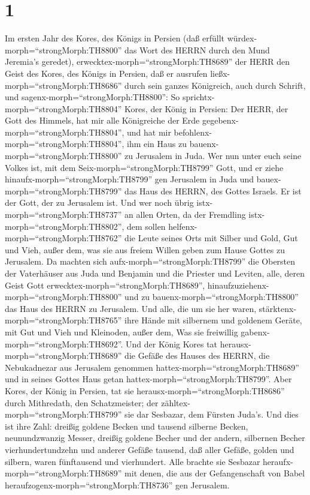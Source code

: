 \hypertarget{section}{%
\section{1}\label{section}}

 Im ersten Jahr des Kores, des Königs in Persien (daß
erfüllt würdex-morph=``strongMorph:TH8800'' das Wort des HERRN durch den
Mund Jeremia's geredet), erwecktex-morph=``strongMorph:TH8689'' der HERR
den Geist des Kores, des Königs in Persien, daß er ausrufen
ließx-morph=``strongMorph:TH8686'' durch sein ganzes Königreich, auch
durch Schrift, und sagenx-morph=``strongMorph:TH8800'':  So
sprichtx-morph=``strongMorph:TH8804'' Kores, der König in Persien: Der
HERR, der Gott des Himmels, hat mir alle Königreiche der Erde
gegebenx-morph=``strongMorph:TH8804'', und hat mir
befohlenx-morph=``strongMorph:TH8804'', ihm ein Haus zu
bauenx-morph=``strongMorph:TH8800'' zu Jerusalem in Juda. 
Wer nun unter euch seine Volkes ist, mit dem
Seix-morph=``strongMorph:TH8799'' Gott, und er ziehe
hinaufx-morph=``strongMorph:TH8799'' gen Jerusalem in Juda und
bauex-morph=``strongMorph:TH8799'' das Haus des HERRN, des Gottes
Israels. Er ist der Gott, der zu Jerusalem ist.  Und wer
noch übrig istx-morph=``strongMorph:TH8737'' an allen Orten, da der
Fremdling istx-morph=``strongMorph:TH8802'', dem sollen
helfenx-morph=``strongMorph:TH8762'' die Leute seines Orts mit Silber
und Gold, Gut und Vieh, außer dem, was sie aus freiem Willen geben zum
Hause Gottes zu Jerusalem.  Da machten sich
aufx-morph=``strongMorph:TH8799'' die Obersten der Vaterhäuser aus Juda
und Benjamin und die Priester und Leviten, alle, deren Geist Gott
erwecktex-morph=``strongMorph:TH8689'',
hinaufzuziehenx-morph=``strongMorph:TH8800'' und zu
bauenx-morph=``strongMorph:TH8800'' das Haus des HERRN zu Jerusalem.
 Und alle, die um sie her waren,
stärktenx-morph=``strongMorph:TH8765'' ihre Hände mit silbernem und
goldenem Geräte, mit Gut und Vieh und Kleinoden, außer dem, Was sie
freiwillig gabenx-morph=``strongMorph:TH8692''.  Und der
König Kores tat herausx-morph=``strongMorph:TH8689'' die Gefäße des
Hauses des HERRN, die Nebukadnezar aus Jerusalem genommen
hattex-morph=``strongMorph:TH8689'' und in seines Gottes Haus getan
hattex-morph=``strongMorph:TH8799''.  Aber Kores, der König
in Persien, tat sie herausx-morph=``strongMorph:TH8686'' durch
Mithredath, den Schatzmeister; der zähltex-morph=``strongMorph:TH8799''
sie dar Sesbazar, dem Fürsten Juda's.  Und dies ist ihre
Zahl: dreißig goldene Becken und tausend silberne Becken, neunundzwanzig
Messer,  dreißig goldene Becher und der andern, silbernen
Becher vierhundertundzehn und anderer Gefäße tausend,  daß
aller Gefäße, golden und silbern, waren fünftausend und vierhundert.
Alle brachte sie Sesbazar heraufx-morph=``strongMorph:TH8689'' mit
denen, die aus der Gefangenschaft von Babel
heraufzogenx-morph=``strongMorph:TH8736'' gen Jerusalem.

